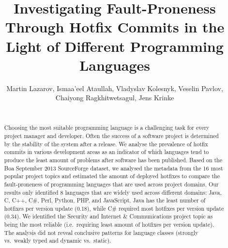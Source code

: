 \documentclass{sig-alternate}
\newcommand\FIXME[1]{\textbf{FIXME: #1}}
\begin{document}
\title{Investigating Fault-Proneness Through Hotfix Commits in the Light of Different Programming Languages}
\author{
  Martin Lazarov, Ismaa'eel Ataullah, Vladyslav Kolesnyk, Veselin Pavlov,\\ Chaiyong Ragkhitwetsagul, Jens Krinke\\
  \\
}

\maketitle

\begin{abstract}
Choosing the most suitable programming language is a challenging task for every project manager and developer. Often the success of a software project is determined by the stability of the system after a release. We analyse the prevalence of hotfix commits in various development areas as an indicator of which languages tend to produce the least amount of problems after software has been published. Based on the Boa September 2013 SourceForge dataset, we analysed the metadata from the 16 most popular project topics and estimated the amount of deployed hotfixes to compare the fault-proneness of programming languages that are used across project domains. Our results only identified 8 languages that are widely used across different domains: Java, C, C++, C\#, Perl, Python, PHP, and JavaScript. Java has the least number of hotfixes per version update (0.18), while C\# required most hotfixes per version update (0.34). We identified the Security and Internet \& Communications project topic as being the most reliable (i.e.\ requiring least amount of hotfixes per version update). The analysis did not reveal conclusive patterns for language classes (strongly vs.\ weakly typed and dynamic vs.\ static).
\end{abstract}



\end{document}
